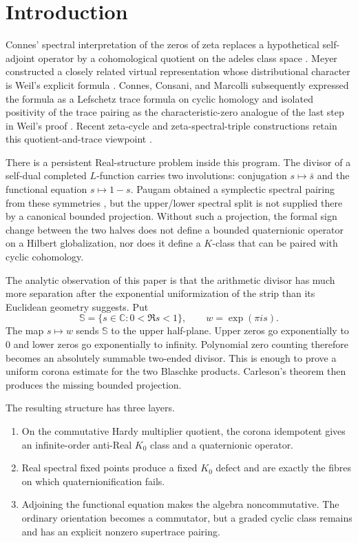 \documentclass[11pt]{article}
\theoremstyle{definition}
\theoremstyle{remark}
\newcommand{\C}{\mathbb C}
\begin{document}
\section{Introduction}

Connes' spectral interpretation of the zeros of zeta replaces a hypothetical
self-adjoint operator by a cohomological quotient on the adeles class space
\cite{Connes1999}.  Meyer constructed a closely related virtual representation
whose distributional character is Weil's explicit formula \cite{Meyer2005}.
Connes, Consani, and Marcolli subsequently expressed the formula as a Lefschetz
trace formula on cyclic homology and isolated positivity of the trace pairing as
the characteristic-zero analogue of the last step in Weil's proof
\cite{CCM2007}.  Recent zeta-cycle and zeta-spectral-triple constructions retain
this quotient-and-trace viewpoint \cite{ConnesConsani2023,CCM2025}.

There is a persistent Real-structure problem inside this program.  The divisor
of a self-dual completed $L$-function carries two involutions: conjugation
$s\mapsto\bar s$ and the functional equation $s\mapsto1-s$.  Paugam obtained a
symplectic spectral pairing from these symmetries \cite{Paugam2009}, but the
upper/lower spectral split is not supplied there by a canonical bounded
projection.  Without such a projection, the formal sign change between the two
halves does not define a bounded quaternionic operator on a Hilbert
globalization, nor does it define a $K$-class that can be paired with cyclic
cohomology.

The analytic observation of this paper is that the arithmetic divisor has much
more separation after the exponential uniformization of the strip than its
Euclidean geometry suggests.  Put
\[
        \mathbb S=\{s\in\C:0<\Re s<1\},\qquad
        w=\exp(\pi i s).
\]
The map $s\mapsto w$ sends $\mathbb S$ to the upper half-plane.  Upper zeros go
exponentially to $0$ and lower zeros go exponentially to infinity.  Polynomial
zero counting therefore becomes an absolutely summable two-ended divisor.
This is enough to prove a uniform corona estimate for the two Blaschke
products.  Carleson's theorem then produces the missing bounded projection.

The resulting structure has three layers.

\begin{enumerate}[label=\textup{(\roman*)}]
\item On the commutative Hardy multiplier quotient, the corona idempotent gives
      an infinite-order anti-Real $K_0$ class and a quaternionic operator.
\item Real spectral fixed points produce a fixed $K_0$ defect and are exactly
      the fibres on which quaternionification fails.
\item Adjoining the functional equation makes the algebra noncommutative.  The
      ordinary orientation becomes a commutator, but a graded cyclic class
      remains and has an explicit nonzero supertrace pairing.
\end{enumerate}
\end{document}
